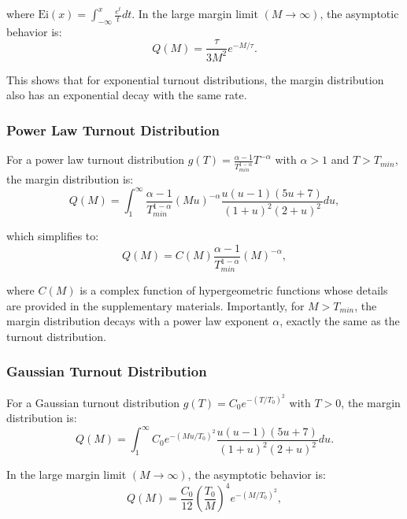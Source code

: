 where $\text{Ei}(x) = \int_{-\infty}^{x}\frac{e^t}{t}dt$. In the large margin limit $(M \rightarrow \infty)$, the asymptotic behavior is:
\begin{equation}
    Q(M)= \frac{\tau}{3M^2}e^{-M/\tau}.
\end{equation}

This shows that for exponential turnout distributions, the margin distribution also has an exponential decay with the same rate.

\subsubsection{Power Law Turnout Distribution}
For a power law turnout distribution $g(T) = \frac{\alpha - 1}{T_{min} ^{1 -\alpha}} T ^ {-\alpha}$ with $\alpha > 1$ and $T>T_{min}$, the margin distribution is:
\begin{equation}
    Q(M) = \int_{1}^{\infty}\frac{\alpha - 1}{T_{min} ^{1 -\alpha}} (Mu) ^ {-\alpha} \frac{u(u - 1)(5u + 7)}{(1 + u)^2 (2 + u)^2}du,
\end{equation}

which simplifies to:
\begin{equation}
    Q(M) = C(M)\frac{\alpha - 1}{T_{min} ^{1 -\alpha}} (M) ^ {-\alpha}, 
    \label{eq:powerlaw}
\end{equation}

where $C(M)$ is a complex function of hypergeometric functions whose details are provided in the supplementary materials. Importantly, for $M > T_{min}$, the margin distribution decays with a power law exponent $\alpha$, exactly the same as the turnout distribution.

\subsubsection{Gaussian Turnout Distribution}
For a Gaussian turnout distribution $g(T) = C_0 e^{-(T/T_0)^2}$ with $T>0$, the margin distribution is:
\begin{equation}
     Q(M) = \int_{1}^{\infty} C_0 e^{-(Mu/T_0)^2}\frac{u(u - 1)(5u + 7)}{(1 + u)^2 (2 + u)^2}du.
\end{equation}

In the large margin limit $(M \rightarrow \infty)$, the asymptotic behavior is:
\begin{equation}
    Q(M) = \frac{C_0}{12}\left(\frac{T_0}{M}\right)^4 e^{-\left(M/ T_0\right)^2}, 
\end{equation}

